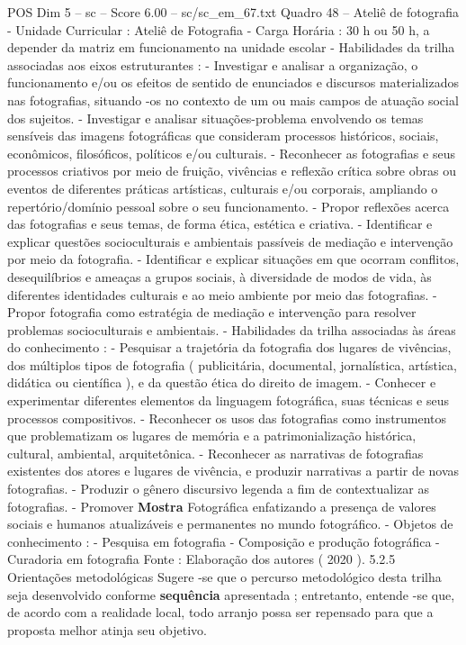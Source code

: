 \begin{textsample}{POS Dim 5 – sc – Score 6.00 – sc/sc\_em\_67.txt}
Quadro 48 – Ateliê de fotografia - Unidade Curricular : Ateliê de Fotografia - Carga Horária : 30 h ou 50 h, a depender da matriz em funcionamento na unidade escolar - Habilidades da trilha associadas aos eixos estruturantes : - Investigar e analisar a organização, o funcionamento e/ou os efeitos de sentido de enunciados e discursos materializados nas fotografias, situando -os no contexto de um ou mais campos de atuação social dos sujeitos. - Investigar e analisar situações-problema envolvendo os temas sensíveis das imagens fotográficas que consideram processos históricos, sociais, econômicos, filosóficos, políticos e/ou culturais. - Reconhecer as fotografias e seus processos criativos por meio de fruição, vivências e reflexão crítica sobre obras ou eventos de diferentes práticas artísticas, culturais e/ou corporais, ampliando o repertório/domínio pessoal sobre o seu funcionamento. - Propor reflexões acerca das fotografias e seus temas, de forma ética, estética e criativa. - Identificar e explicar questões socioculturais e ambientais passíveis de mediação e intervenção por meio da fotografia. - Identificar e explicar situações em que ocorram conflitos, desequilíbrios e ameaças a grupos sociais, à diversidade de modos de vida, às diferentes identidades culturais e ao meio ambiente por meio das fotografias. - Propor fotografia como estratégia de mediação e intervenção para resolver problemas socioculturais e ambientais. - Habilidades da trilha associadas às áreas do conhecimento : - Pesquisar a trajetória da fotografia dos lugares de vivências, dos múltiplos tipos de fotografia ( publicitária, documental, jornalística, artística, didática ou científica ), e da questão ética do direito de imagem. - Conhecer e experimentar diferentes elementos da linguagem fotográfica, suas técnicas e seus processos compositivos. - Reconhecer os usos das fotografias como instrumentos que problematizam os lugares de memória e a patrimonialização histórica, cultural, ambiental, arquitetônica. - Reconhecer as narrativas de fotografias existentes dos atores e lugares de vivência, e produzir narrativas a partir de novas fotografias. - Produzir o gênero discursivo legenda a fim de contextualizar as fotografias. - Promover \textbf{Mostra} Fotográfica enfatizando a presença de valores sociais e humanos atualizáveis e permanentes no mundo fotográfico. - Objetos de conhecimento : - Pesquisa em fotografia - Composição e produção fotográfica - Curadoria em fotografia Fonte : Elaboração dos autores ( 2020 ). 5.2.5 Orientações metodológicas Sugere -se que o percurso metodológico desta trilha seja desenvolvido conforme \textbf{sequência} apresentada ; entretanto, entende -se que, de acordo com a realidade local, todo arranjo possa ser repensado para que a proposta melhor atinja seu objetivo.

\end{textsample}
